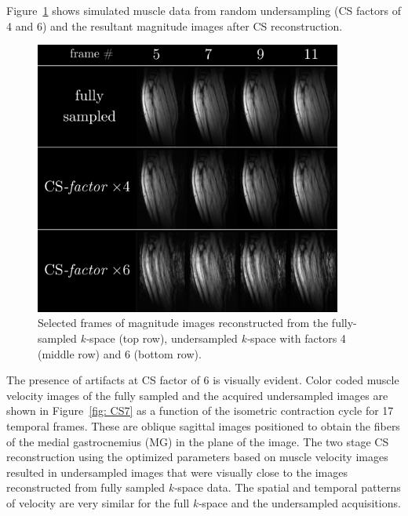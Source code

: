 Figure~\ref{fig: CSS6} shows simulated muscle data from random undersampling (CS factors of 4 and 6) and the resultant magnitude images after CS reconstruction.
\begin{figure}[!htb]
\vspace{+0.2cm}
\centering
\includegraphics[width=0.9\textwidth]{Figures/CS1_11.pdf}
\caption[Selected frames of magnitude images reconstructed from the fully-sampled, undersampled \mbox{\textit{k-}space} with factors 4 and 6]{Selected frames of magnitude images reconstructed from the fully-sampled \mbox{\textit{k-}space} (top row), undersampled \mbox{\textit{k-}space} with factors 4 (middle row) and 6 (bottom row).}
\label{fig: CSS6}
\end{figure}
The presence of artifacts at CS factor of 6 is visually evident. 
Color coded muscle velocity images of the fully sampled and the acquired undersampled images are shown in Figure~\ref{fig: CS7} as a function of the isometric contraction cycle for 17 temporal frames.
These are oblique sagittal images positioned to obtain the fibers of the medial gastrocnemius (MG) in the plane of the image. 
The two stage CS reconstruction using the optimized parameters based on muscle velocity images resulted in undersampled images that were visually close to the images reconstructed from fully sampled \mbox{\textit{k-}space} data. 
The spatial and temporal patterns of velocity are very similar for the full \mbox{\textit{k-}space} and the undersampled acquisitions.

